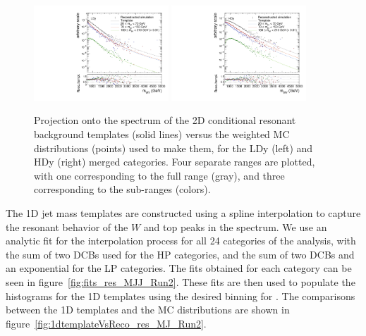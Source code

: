 \begin{figure}[htbp]
  \centering
  \includegraphics[width=0.45\textwidth]{fig/2Dfit/templateVsReco_resCond_MVV_e_HP_nobb_LDy.pdf}
  \includegraphics[width=0.45\textwidth]{fig/2Dfit/templateVsReco_resCond_MVV_e_HP_nobb_HDy.pdf}
  \caption{
    Projection onto the \MVV spectrum of the 2D conditional resonant background templates (solid lines) versus the weighted MC distributions (points) used to make them, for the LDy (left) and HDy (right) merged categories.
    Four separate \MJ ranges are plotted, with one corresponding to the full \MJ range (gray), and three corresponding to the sub-ranges (colors).
  }
  \label{fig:condTemplateVscondReco_res_MVV_Run2}
\end{figure}

The 1D jet mass templates are constructed using a spline interpolation to capture the resonant behavior of the $W$ and top peaks in the \MJ spectrum.
We use an analytic fit for the interpolation process for all 24 categories of the analysis, with the sum of two DCBs used for the HP categories, and the sum of two DCBs and an exponential for the LP categories.
The fits obtained for each category can be seen in figure~\ref{fig:fits_res_MJJ_Run2}.
These fits are then used to populate the histograms for the 1D templates using the desired binning for \MJ.
The comparisons between the 1D templates and the MC distributions are shown in figure~\ref{fig:1dtemplateVsReco_res_MJ_Run2}.

